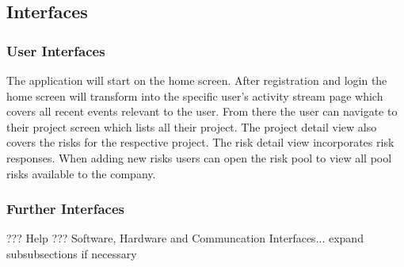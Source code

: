\subsection{Interfaces}
\label{sec:domainBe}

\subsubsection{User Interfaces}
\label{sec:domainBea}
The application will start on the home screen. After registration and login the home screen will transform into the specific user's activity stream page which covers all recent events relevant to the user. From there the user can navigate to their project screen which lists all their project. The project detail view also covers the risks for the respective project. The risk detail view incorporates risk responses.
When adding new risks users can open the risk pool to view all pool risks available to the company.
\subsubsection{Further Interfaces}
\label{sec:domainBeb}
??? Help ???
Software, Hardware and Communcation Interfaces... expand subsubsections if necessary
